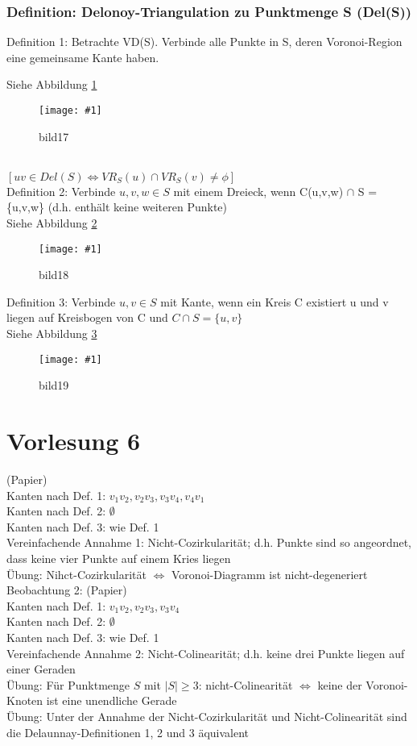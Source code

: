 \documentclass{article}
\newcommand{\bild}[4]{ %
	\begin{figure}[h!]
		\centering
		\texttt{[image: \#1]}
		\caption{#3}
		\label{#4}
	\end{figure}	
}
\newcommand{\sieheBild}[4]{
	Siehe Abbildung \ref{#4}
	\bild{#1}{#2}{#3}{#4}
}
\begin{document}
\subsubsection*{Definition: Delonoy-Triangulation zu Punktmenge S (Del(S))}
Definition 1: Betrachte VD(S). Verbinde alle Punkte in S, deren Voronoi-Region eine gemeinsame Kante haben.
\sieheBild{Bilder/17.png}{0.4}{bild17}{Bild 17}\\
$[uv \in Del(S) \Leftrightarrow VR_S(u) \cap VR_S(v) \neq \phi]$
\\
Definition 2: Verbinde $u,v,w \in S$ mit einem Dreieck, wenn C(u,v,w) $\cap$ S = \{u,v,w\}
 (d.h. enthält keine weiteren Punkte)
 \\
\sieheBild{Bilder/18.png}{0.4}{bild18}{Bild 18}
 
 Definition 3: Verbinde $u,v \in S$ mit Kante, wenn ein Kreis C existiert u und v liegen auf Kreisbogen von C und $C \cap S = \{u,v\}$
 \\
\sieheBild{Bilder/19.png}{0.4}{bild19}{Bild 19}
 

\section{Vorlesung 6}
(Papier) \\
Kanten nach Def. 1: $v_1v_2, v_2v_3, v_3v_4, v_4v_1$ \\
Kanten nach Def. 2: $\emptyset$ \\
Kanten nach Def. 3: wie Def. 1 \\
Vereinfachende Annahme 1: Nicht-Cozirkularität; d.h. Punkte sind so
angeordnet, dass keine vier Punkte auf einem Kries liegen \\
Übung: Nihct-Cozirkularität $\Leftrightarrow$ Voronoi-Diagramm ist
nicht-degeneriert \\
Beobachtung 2: (Papier) \\
Kanten nach Def. 1: $v_1v_2, v_2v_3, v_3v_4$ \\
Kanten nach Def. 2: $\emptyset$ \\
Kanten nach Def. 3: wie Def. 1 \\
Vereinfachende Annahme 2: Nicht-Colinearität; d.h. keine drei Punkte
liegen auf einer Geraden \\
Übung: Für Punktmenge $S$ mit $|S| \geq 3$: nicht-Colinearität
$\Leftrightarrow$ keine der Voronoi-Knoten ist eine unendliche Gerade \\
Übung: Unter der Annahme der Nicht-Cozirkularität und Nicht-Colinearität
sind die Delaunnay-Definitionen 1, 2 und 3 äquivalent \\
\end{document}
